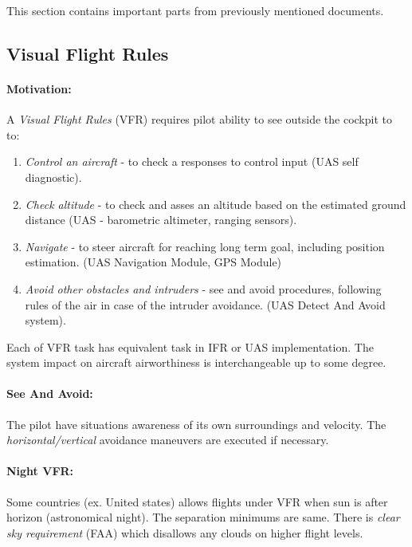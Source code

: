 \begin{note}
    This section contains important parts from previously mentioned documents. 
\end{note}

\subsection{Visual Flight Rules}\label{sec:VisualFlightRules}
\paragraph{Motivation:} A \emph{Visual Flight Rules} (VFR) requires pilot ability to see outside the cockpit to to:

\begin{enumerate}
    \item \emph{Control an aircraft} - to check a responses to control input (UAS self diagnostic).
    
    \item \emph{Check altitude} - to check and asses an altitude based on the estimated ground distance (UAS - barometric altimeter, ranging sensors).
    
    \item \emph{Navigate} - to steer aircraft for reaching long term goal, including position estimation. (UAS Navigation Module, GPS Module)
    
    \item \emph{Avoid other obstacles and intruders} - see and avoid procedures, following rules of the air in case of the intruder avoidance. (UAS Detect And Avoid system).
\end{enumerate}

\begin{note}
    Each of VFR task has equivalent task in IFR or UAS implementation. The system impact on aircraft airworthiness is interchangeable up to some degree.
\end{note}

\paragraph{See And Avoid:} The pilot have situations awareness of its own surroundings and velocity. The \emph{horizontal/vertical} avoidance maneuvers are executed if necessary. 

\paragraph{Night VFR:} Some countries (ex. United states) allows flights under VFR when sun is after horizon (astronomical night). The separation minimums are same. There is \emph{clear sky requirement} (FAA) which disallows any clouds on higher flight levels.



